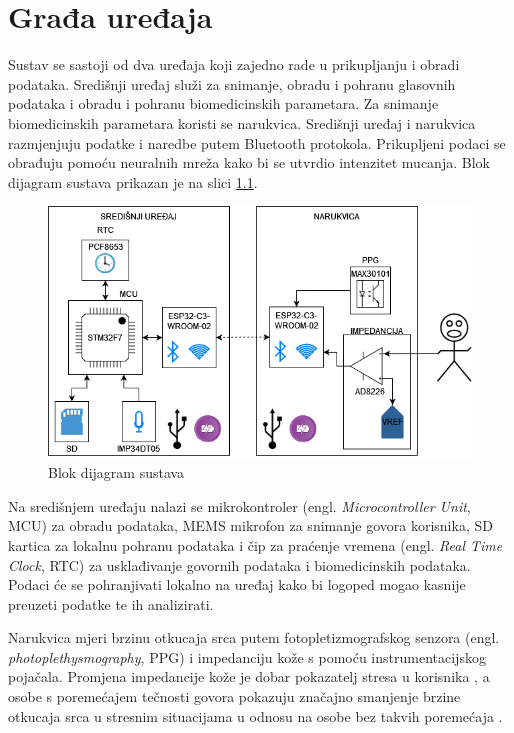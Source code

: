 \chapter{Građa uređaja}
\label{pog:structure}

Sustav se sastoji od dva uređaja koji zajedno rade u prikupljanju i obradi podataka. Središnji uređaj služi za snimanje, obradu i pohranu glasovnih podataka i obradu i pohranu biomedicinskih parametara. Za snimanje biomedicinskih parametara koristi se narukvica. Središnji uređaj i narukvica razmjenjuju podatke i naredbe putem Bluetooth protokola. Prikupljeni podaci se obrađuju pomoću neuralnih mreža kako bi se utvrdio intenzitet mucanja. Blok dijagram sustava prikazan je na slici \ref{slk:BD_MAIN}.
\begin{figure}[htb]
    \centering
    \includegraphics[width=\textwidth]{Figures/block_diagram.drawio.png}
    \caption{Blok dijagram sustava}
    \label{slk:BD_MAIN}
\end{figure}

Na središnjem uređaju nalazi se mikrokontroler (engl. \textit{Microcontroller Unit}, MCU) za obradu podataka, MEMS mikrofon za snimanje govora korisnika, SD kartica za lokalnu pohranu podataka i čip za praćenje vremena (engl. \textit{Real Time Clock}, RTC) za usklađivanje govornih podataka i biomedicinskih podataka. Podaci će se pohranjivati lokalno na uređaj kako bi logoped mogao kasnije preuzeti podatke te ih analizirati.

Narukvica mjeri brzinu otkucaja srca putem fotopletizmografskog senzora (engl. \textit{photoplethysmography}, PPG) i impedanciju kože s pomoću instrumentacijskog pojačala. Promjena impedancije kože je dobar pokazatelj stresa u korisnika \cite{edr}, a osobe s poremećajem tečnosti govora pokazuju značajno smanjenje brzine otkucaja srca u stresnim situacijama u odnosu na osobe bez takvih poremećaja \cite{ALM2004123}.

